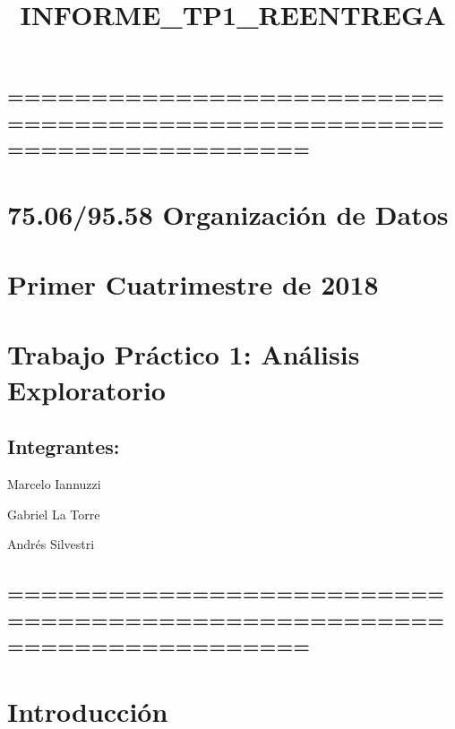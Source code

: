 \documentclass[11pt]{article}
\title{INFORME\_TP1\_REENTREGA}
\begin{document}
    
    
    \maketitle
    
    

    
    \hypertarget{section}{%
\subsection{======================================================================}\label{section}}

\hypertarget{organizaciuxf3n-de-datos}{%
\section{75.06/95.58 Organización de
Datos}\label{organizaciuxf3n-de-datos}}

\hypertarget{primer-cuatrimestre-de-2018}{%
\section{Primer Cuatrimestre de
2018}\label{primer-cuatrimestre-de-2018}}

\hypertarget{trabajo-pruxe1ctico-1-anuxe1lisis-exploratorio}{%
\section{Trabajo Práctico 1: Análisis
Exploratorio}\label{trabajo-pruxe1ctico-1-anuxe1lisis-exploratorio}}

\hypertarget{integrantes}{%
\subsection{Integrantes:}\label{integrantes}}

Marcelo Iannuzzi

Gabriel La Torre

Andrés Silvestri

\hypertarget{section-1}{%
\subsection{======================================================================}\label{section-1}}

\hypertarget{introducciuxf3n}{%
\section{Introducción}\label{introducciuxf3n}}
\end{document}
